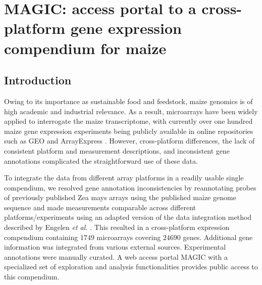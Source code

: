 \chapter{MAGIC: access portal to a cross-platform gene expression compendium for maize}\label{ch:magic}


\instructionsintroduction




\section{Introduction}
Owing to its importance as sustainable food and feedstock,
maize genomics is of high academic and industrial relevance.
As a result, microarrays have been widely applied to interrogate
the maize transcriptome, with currently over one hundred maize gene expression 
experiments being publicly available in online repositories
such as GEO \cite{Barrett2011} and ArrayExpress \cite{Parkinson2009}. 
However, cross-platform differences, the lack of
consistent platform and measurement descriptions, and inconsistent 
gene annotations complicated the straightforward
use of these data.

To integrate the data from different array platforms in a readily 
usable single compendium, we resolved gene annotation
inconsistencies by reannotating probes of previously published
Zea mays arrays using the published maize genome sequence \cite{Schnable2009}
 and made measurements comparable
across different platforms/experiments using an adapted version
of the data integration method described by Engelen \textit{et al.} 
\cite{Engelen2011}.
This resulted in a cross-platform expression compendium containing 
$1749$ microarrays covering $24690$ genes. Additional
gene information was integrated from various external sources.
Experimental annotations were manually curated. A web access
portal MAGIC with a specialized set of exploration and analysis
functionalities provides public access to this compendium.


